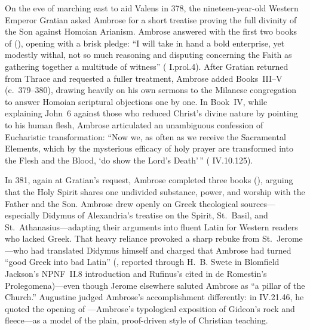 On the eve of marching east to aid Valens in 378, the nineteen-year-old Western Emperor Gratian asked Ambrose for a short treatise proving the full divinity of the Son against Homoian Arianism. Ambrose answered with the first two books of  (), opening with a brisk pledge: ``I will take in hand a bold enterprise, yet modestly withal, not so much reasoning and disputing concerning the Faith as gathering together a multitude of witness'' ( I.prol.4). After Gratian returned from Thrace and requested a fuller treatment, Ambrose added Books~III--V (c.~379--380), drawing heavily on his own sermons to the Milanese congregation to answer Homoian scriptural objections one by one. In Book~IV, while explaining John~6 against those who reduced Christ's divine nature by pointing to his human flesh, Ambrose articulated an unambiguous confession of Eucharistic transformation: ``Now we, as often as we receive the Sacramental Elements, which by the mysterious efficacy of holy prayer are transformed into the Flesh and the Blood, `do show the Lord's Death'\,'' ( IV.10.125).

In 381, again at Gratian's request, Ambrose completed three books  (), arguing that the Holy Spirit shares one undivided substance, power, and worship with the Father and the Son. Ambrose drew openly on Greek theological sources---especially Didymus of Alexandria's treatise on the Spirit, St.~Basil, and St.~Athanasius---adapting their arguments into fluent Latin for Western readers who lacked Greek. That heavy reliance provoked a sharp rebuke from St.~Jerome---who had translated Didymus himself and charged that Ambrose had turned ``good Greek into bad Latin'' (, reported through H.~B. Swete in Blomfield Jackson's NPNF~II.8 introduction and Rufinus's  cited in de Romestin's Prolegomena)---even though Jerome elsewhere saluted Ambrose as ``a pillar of the Church.'' Augustine judged Ambrose's accomplishment differently: in  IV.21.46, he quoted the opening of ---Ambrose's typological exposition of Gideon's rock and fleece---as a model of the plain, proof-driven style of Christian teaching.

